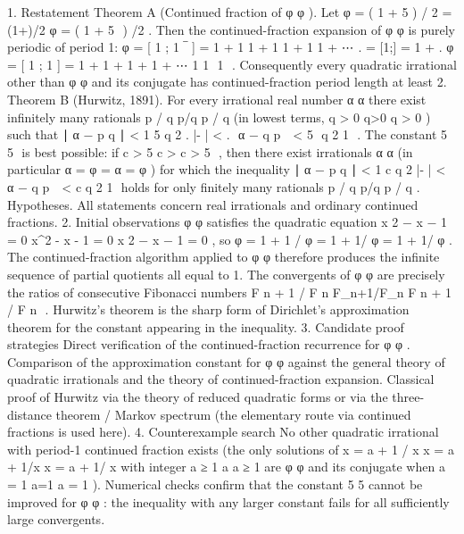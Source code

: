 {{{{{{1. Restatement
Theorem A (Continued fraction of
φ
\varphi
φ
).
Let
φ
=
(
1
+
5
)
/
2
\varphi = (1+)/2
φ
=
(
1
+
5
​
)
/2
. Then the continued-fraction expansion of
φ
\varphi
φ
is purely periodic of period 1:
φ
=
[
1
;
1
‾
]
=
1
+
1
1
+
1
1
+
1
1
+
⋯
.
\varphi = [1;] = 1 + .
φ
=
[
1
;
1
]
=
1
+
1
+
1
+
1
+
⋯
1
​
1
​
1
​
.
Consequently every quadratic irrational other than
φ
\varphi
φ
and its conjugate has continued-fraction period length at least 2.
Theorem B (Hurwitz, 1891).
For every irrational real number
α
\alpha
α
there exist infinitely many rationals
p
/
q
p/q
p
/
q
(in lowest terms,
q
>
0
q>0
q
>
0
) such that
∣
α
−
p
q
∣
<
1
5
q
2
.
\bigl|\alpha - \bigr| < .
​
α
−
q
p
​
​
<
5
​
q
2
1
​
.
The constant
5
5
​
is best possible: if
c
>
5
c > 
c
>
5
​
, then there exist irrationals
α
\alpha
α
(in particular
α
=
φ
\alpha = \varphi
α
=
φ
) for which the inequality
∣
α
−
p
q
∣
<
1
c
q
2
\bigl|\alpha - \bigr| < 
​
α
−
q
p
​
​
<
c
q
2
1
​
holds for only finitely many rationals
p
/
q
p/q
p
/
q
.
Hypotheses.
All statements concern real irrationals and ordinary continued fractions.
2. Initial observations
φ
\varphi
φ
satisfies the quadratic equation
x
2
−
x
−
1
=
0
x^2 - x - 1 = 0
x
2
−
x
−
1
=
0
, so
φ
=
1
+
1
/
φ
\varphi = 1 + 1/\varphi
φ
=
1
+
1/
φ
.
The continued-fraction algorithm applied to
φ
\varphi
φ
therefore produces the infinite sequence of partial quotients all equal to 1.
The convergents of
φ
\varphi
φ
are precisely the ratios of consecutive Fibonacci numbers
F
n
+
1
/
F
n
F_{n+1}/F_n
F
n
+
1
​
/
F
n
​
.
Hurwitz’s theorem is the sharp form of Dirichlet’s approximation theorem for the constant appearing in the inequality.
3. Candidate proof strategies
Direct verification of the continued-fraction recurrence for
φ
\varphi
φ
.
Comparison of the approximation constant for
φ
\varphi
φ
against the general theory of quadratic irrationals and the theory of continued-fraction expansion.
Classical proof of Hurwitz via the theory of reduced quadratic forms or via the three-distance theorem / Markov spectrum (the elementary route via continued fractions is used here).
4. Counterexample search
No other quadratic irrational with period-1 continued fraction exists (the only solutions of
x
=
a
+
1
/
x
x = a + 1/x
x
=
a
+
1/
x
with integer
a
≥
1
a
a
≥
1
are
φ
\varphi
φ
and its conjugate when
a
=
1
a=1
a
=
1
).
Numerical checks confirm that the constant
5
5
​
cannot be improved for
φ
\varphi
φ
: the inequality with any larger constant fails for all sufficiently large convergents.
}}}}}}
